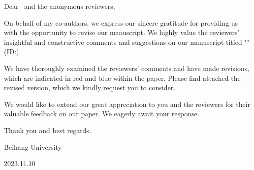 \noindent Dear \editorname \, and the anonymous reviewers,

On behalf of my co-authors, we express our sincere gratitude for providing us with the opportunity to revise our manuscript. We highly value the reviewers' insightful and constructive comments and suggestions on our manuscript titled "\thetitle" (ID:\manuscript).

We have thoroughly examined the reviewers' comments and have made revisions, which are indicated in red and blue within the paper. Please find attached the revised version, which we kindly request you to consider.

We would like to extend our great appreciation to you and the reviewers for their valuable feedback on our paper. We eagerly await your response.

Thank you and best regards.
\begin{flushright}
\theauthor

Beihang University

2023.11.10
\end{flushright}